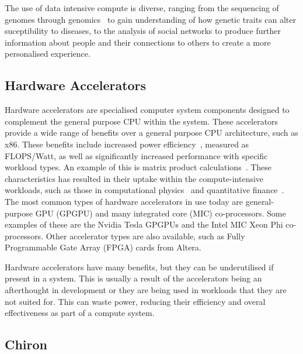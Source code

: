 \documentclass[12pt,a4paper]{article}
\begin{document}
			The use of data intensive compute is diverse, ranging from the sequencing of genomes through genomics~\cite{genomics-big-data} to gain understanding of how genetic traits can alter suceptibility to diseases, to the analysis of social networks to produce further information about people and their connections to others to create a more personalised experience.

	
		\subsection{Hardware Accelerators} %
		\label{sub:hardware_accelerators}

			Hardware accelerators are specialised computer system components designed to complement the general purpose CPU within the system. These accelerators provide a wide range of benefits over a general purpose CPU architecture, such as x86. These benefits include increased power efficiency~\cite{energy-efficient-gpu}, measured as FLOPS/Watt, as well as significantly increased performance with specific workload types. An example of this is matrix product calculations~\cite{accelerating-matrix-product}. These characteristics has resulted in their uptake within the compute-intensive workloads, such as those in computational physics~\cite{computational-physics-gpu} and quantitative finance~\cite{quantitative-finance-gpu}. The most common types of hardware accelerators in use today are general-purpose GPU (GPGPU) and many integrated core (MIC) co-processors. Some examples of these are the Nvidia Tesla GPGPUs and the Intel MIC Xeon Phi co-processors. Other accelerator types are also available, such as Fully Programmable Gate Array (FPGA) cards from Altera.

			Hardware accelerators have many benefits, but they can be underutilised if present in a system. This is usually a result of the accelerators being an afterthought in development or they are being used in workloads that they are not suited for. This can waste power, reducing their efficiency and overal effectiveness as part of a compute system.
			

		\subsection{Chiron} %
		\label{sub:chiron}
\end{document}
